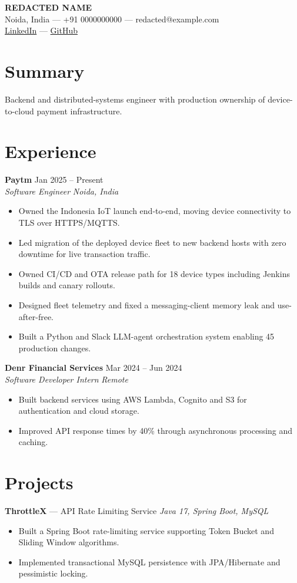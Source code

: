 \documentclass[a4paper,9pt]{article}
\newcommand{\role}[4]{%
  \textbf{#1} \hfill #2 \\
  \textit{#3} \hfill \textit{#4}\par\vspace{2pt}}
\begin{document}
\begin{center}
  {\LARGE \textbf{REDACTED NAME}} \\
  Noida, India --- +91 0000000000 --- redacted@example.com \\
  \href{https://linkedin.com/in/thealonemusk}{LinkedIn} ---
  \href{https://github.com/thealonemusk}{GitHub}
\end{center}

\section{Summary}
Backend and distributed-systems engineer with production ownership of device-to-cloud payment infrastructure.

\section{Experience}
\role{Paytm}{Jan 2025 -- Present}{Software Engineer}{Noida, India}
\begin{itemize}
  \item Owned the Indonesia IoT launch end-to-end, moving device connectivity to TLS over HTTPS/MQTTS.
  \item Led migration of the deployed device fleet to new backend hosts with zero downtime for live transaction traffic.
  \item Owned CI/CD and OTA release path for 18 device types including Jenkins builds and canary rollouts.
  \item Designed fleet telemetry and fixed a messaging-client memory leak and use-after-free.
  \item Built a Python and Slack LLM-agent orchestration system enabling 45 production changes.
\end{itemize}

\role{Denr Financial Services}{Mar 2024 -- Jun 2024}{Software Developer Intern}{Remote}
\begin{itemize}
  \item Built backend services using AWS Lambda, Cognito and S3 for authentication and cloud storage.
  \item Improved API response times by 40\% through asynchronous processing and caching.
\end{itemize}

\section{Projects}
\textbf{ThrottleX} --- API Rate Limiting Service \hfill \textit{Java 17, Spring Boot, MySQL}
\begin{itemize}
  \item Built a Spring Boot rate-limiting service supporting Token Bucket and Sliding Window algorithms.
  \item Implemented transactional MySQL persistence with JPA/Hibernate and pessimistic locking.
\end{itemize}
\end{document}
